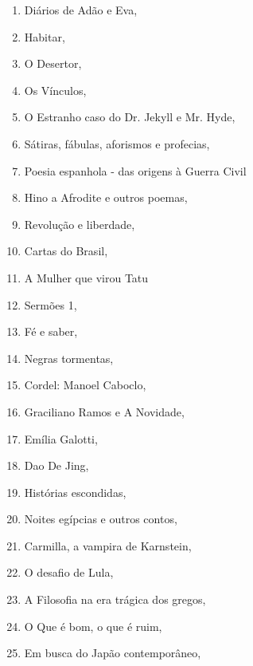 \begin{multicols}{2}
\begin{enumerate}
\item Diários de Adão e Eva, {}
\item Habitar, {}
\item O Desertor, {}
\item Os Vínculos, {}
\item O Estranho caso do Dr. Jekyll e Mr. Hyde, {}
\item Sátiras, fábulas, aforismos e profecias, {}
\item Poesia espanhola - das origens à Guerra Civil
\item Hino a Afrodite e outros poemas, {}
\item Revolução e liberdade, {}
\item Cartas do Brasil, {}
\item A Mulher que virou Tatu
\item Sermões 1, {}
\item Fé e saber, {}
\item Negras tormentas, {}
\item Cordel: Manoel Caboclo, {}
\item Graciliano Ramos e A Novidade, {}
\item Emília Galotti, {}
\item Dao De Jing, {}
\item Histórias escondidas, {}
\item Noites egípcias e outros contos, {}
\item Carmilla, a vampira de Karnstein, {}
\item O desafio de Lula, {}
\item A Filosofia na era trágica dos gregos, {}
\item O Que é bom, o que é ruim, {}
\item Em busca do Japão contemporâneo, {}

\end{enumerate}
\end{multicols}
